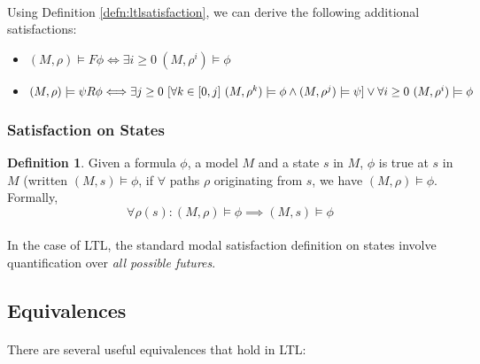 \documentclass{article}
\theoremstyle{plain}
\theoremstyle{definition}
\newtheorem{defn}[thm]{Definition} %
\begin{document}
\begin{multicols}{2}
\paragraph{} Using Definition \ref{defn:ltlsatisfaction}, we can derive the following additional satisfactions:

\begin{itemize}
\item $(M, \rho) \models F\phi \Longleftrightarrow \exists i \geq 0\ (M, \rho^i) \models \phi$
\item $(M, \rho) \models \psi R\phi \Longleftrightarrow\\ \exists j \geq 0\ \lbrack \forall k \in [0, j]\ (M, \rho^k) \models \phi \land (M, \rho^j) \models \psi\rbrack\\ \lor \forall i \geq 0\ (M, \rho^i) \models \phi$
\end{itemize}

\subsubsection{Satisfaction on States}
\begin{defn}
Given a formula $\phi$, a model $M$ and a state $s$ in $M$, $\phi$ is true at $s$ in $M$ (written $(M, s) \models \phi$, if $\forall$ paths $\rho$ originating from $s$, we have $(M, \rho) \models \phi$. Formally, $$\forall \rho(s): (M, \rho) \models \phi \implies (M, s) \models \phi$$
\end{defn}

\paragraph{} In the case of LTL, the standard modal satisfaction definition on states involve quantification over \textit{all possible futures}.

\subsection{Equivalences}

\paragraph{} There are several useful equivalences that hold in LTL:


\end{multicols}
\end{document}
